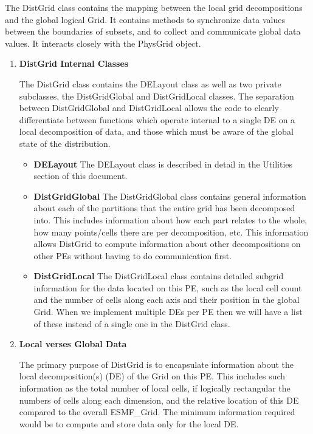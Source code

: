 

The DistGrid class contains the mapping between the local grid decompositions
and the global logical Grid.  It contains methods to synchronize data values
between the boundaries of subsets, and to collect and communicate global data
values. It interacts closely with the PhysGrid object.

\begin{enumerate}

\item {\bf DistGrid Internal Classes}

The DistGrid class contains the DELayout class as well as two private subclasses,
the DistGridGlobal and DistGridLocal classes.  The separation between DistGridGlobal
and DistGridLocal allows the code to clearly differentiate between functions which
operate internal to a single DE on a local decomposition of data, and those which
must be aware of the global state of the distribution.
\begin{itemize}
\item {\bf DELayout} The DELayout class is described in detail in the Utilities
section of this document.
\item {\bf DistGridGlobal} The DistGridGlobal class contains general information
about each of the partitions that the entire grid has been decomposed into. This
includes information about how each part relates to the whole, how many points/cells
there are per decomposition, etc.  This information allows DistGrid to compute
information about other decompositions on other PEs without having to do communication
first.
\item {\bf DistGridLocal} The DistGridLocal class contains detailed subgrid
information for the data located on this PE, such as the local cell count and the
number of cells along each axis and their position in the global Grid.  When we
implement multiple DEs per PE then we will have a list of these instead of a single
one in the DistGrid class.
\end{itemize}

\item {\bf Local verses Global Data}

The primary purpose of DistGrid is to encapsulate information
about the local decomposition(s) (DE) of the Grid on this PE.  
This includes such information as the total 
number of local cells, if logically rectangular the numbers of cells along 
each dimension, and the relative location of this DE compared to the
overall ESMF\_Grid.  The minimum information required would be
to compute and store data only for the local DE.


\end{enumerate}
